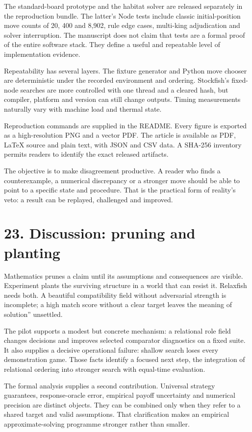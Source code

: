 \documentclass[10pt]{article}
\begin{document}
The standard-board prototype and the habitat solver are released separately in the reproduction bundle. The latter's Node tests include classic initial-position move counts of 20, 400 and 8,902, rule edge cases, multi-king adjudication and solver interruption. The manuscript does not claim that tests are a formal proof of the entire software stack. They define a useful and repeatable level of implementation evidence.

Repeatability has several layers. The fixture generator and Python move chooser are deterministic under the recorded environment and ordering. Stockfish's fixed-node searches are more controlled with one thread and a cleared hash, but compiler, platform and version can still change outputs. Timing measurements naturally vary with machine load and thermal state.

Reproduction commands are supplied in the README. Every figure is exported as a high-resolution PNG and a vector PDF. The article is available as PDF, LaTeX source and plain text, with JSON and CSV data. A SHA-256 inventory permits readers to identify the exact released artifacts.

The objective is to make disagreement productive. A reader who finds a counterexample, a numerical discrepancy or a stronger move should be able to point to a specific state and procedure. That is the practical form of reality's veto: a result can be replayed, challenged and improved.

\clearpage
\section*{23. Discussion: pruning and planting}
Mathematics prunes a claim until its assumptions and consequences are visible. Experiment plants the surviving structure in a world that can resist it. Relaxfish needs both. A beautiful compatibility field without adversarial strength is incomplete; a high match score without a clear target leaves the meaning of solution'' unsettled.

The pilot supports a modest but concrete mechanism: a relational role field changes decisions and improves selected comparator diagnostics on a fixed suite. It also supplies a decisive operational failure: shallow search loses every demonstration game. Those facts identify a focused next step, the integration of relational ordering into stronger search with equal-time evaluation.

The formal analysis supplies a second contribution. Universal strategy guarantees, response-oracle error, empirical payoff uncertainty and numerical precision are distinct objects. They can be combined only when they refer to a shared target and valid assumptions. That clarification makes an empirical approximate-solving programme stronger rather than smaller.
\end{document}
